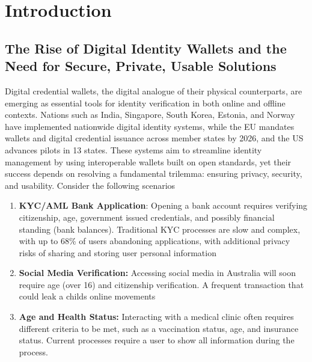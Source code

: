 \chapter{Introduction}

\section{The Rise of Digital Identity Wallets and the Need for Secure, Private, Usable Solutions}
Digital credential wallets, the digital analogue of their physical counterparts, are emerging as essential tools for identity verification in both online and offline contexts. Nations such as India, Singapore, South Korea, Estonia, and Norway have implemented nationwide digital identity systems, while the EU mandates wallets and digital credential issuance across member states by 2026, and the US advances pilots in 13 states.  These systems aim to streamline identity management by using interoperable wallets built on open standards, yet their success depends on resolving a fundamental trilemma: ensuring privacy, security, and usability. Consider the following scenarios

\begin{enumerate}\label{chap1_use_cases_kyc_socialmedia_age_and_health}
    \item \textbf{KYC/AML Bank Application}: Opening a bank account requires verifying citizenship, age, government issued credentials, and possibly financial standing (bank balances). Traditional KYC processes are slow and complex, with up to 68\% of users abandoning applications, with additional privacy risks of sharing and storing user personal information

    \item \textbf{Social Media Verification:} Accessing social media in Australia will soon require age (over 16) and citizenship verification. A frequent transaction that could leak a childs online movements 

    \item \textbf{Age and Health Status: } Interacting with a medical clinic often requires different criteria to be met, such as a vaccination status, age, and insurance status. Current processes require a user to show all information during the process. 
\end{enumerate}

